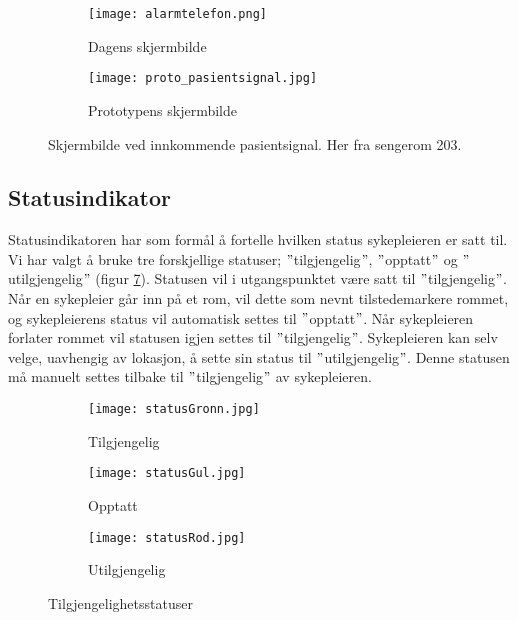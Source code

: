 \begin{figure}[H]
\centering
	\begin{subfigure}[b]{0.4\textwidth}
	\texttt{[image: alarmtelefon.png]}
	\caption{Dagens skjermbilde}
	\label{gammelPasientsignal}
	\end{subfigure}
	\begin{subfigure}[b]{0.5\textwidth}
	\texttt{[image: proto\_pasientsignal.jpg]}
	\caption{Prototypens skjermbilde}
	\label{protoPasientsignal}
	\end{subfigure}
	\caption{Skjermbilde ved innkommende pasientsignal. Her fra sengerom 203.}
	\label{skjermbilder}
\end{figure}

\subsection{Statusindikator}
Statusindikatoren har som formål å fortelle hvilken status sykepleieren er satt til. Vi har valgt å bruke tre forskjellige statuser; $"$tilgjengelig$"$, $"$opptatt$"$ og $"$utilgjengelig$"$ (figur \ref{tilgjengelighetsstatuser}). Statusen vil i utgangspunktet være satt til $"$tilgjengelig$"$. Når en sykepleier går inn på et rom, vil dette som nevnt tilstedemarkere rommet, og sykepleierens status vil automatisk settes til $"$opptatt$"$. Når sykepleieren forlater rommet vil statusen igjen settes til $"$tilgjengelig$"$. Sykepleieren kan selv velge, uavhengig av lokasjon, å sette sin status til $"$utilgjengelig$"$. Denne statusen må manuelt settes tilbake til $"$tilgjengelig$"$ av sykepleieren.

\begin{figure}[H]
	\centering
	\begin{subfigure}[b]{0.3\textwidth}
		\texttt{[image: statusGronn.jpg]}
		\caption{Tilgjengelig}
		\label{proto_startside}
	\end{subfigure}
	\begin{subfigure}[b]{0.3\textwidth}
		\texttt{[image: statusGul.jpg]}
		\caption{Opptatt}
		\label{proto_startside}
	\end{subfigure}
	\begin{subfigure}[b]{0.3\textwidth}
		\texttt{[image: statusRod.jpg]}
		\caption{Utilgjengelig}
		\label{proto_startside_medMeny}
	\end{subfigure}
	\caption{Tilgjengelighetsstatuser}
	\label{tilgjengelighetsstatuser}
\end{figure}

